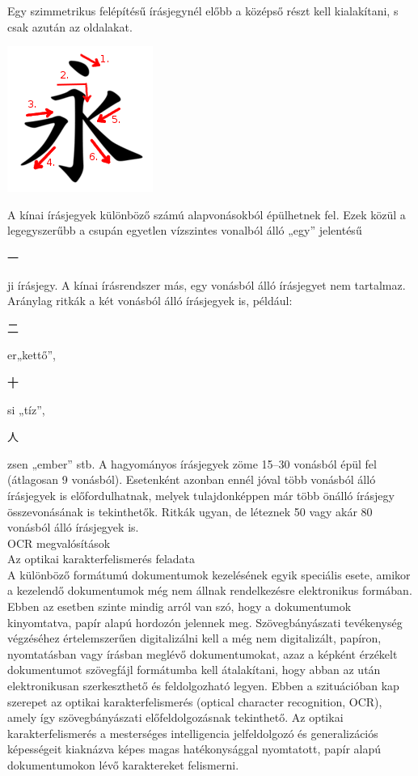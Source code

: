 Egy szimmetrikus felépítésű írásjegynél előbb a középső részt kell kialakítani, s csak azután az oldalakat.

\begin{center}
	\includegraphics[scale=1.0]{images/vonasrend_ordered.png}
\end{center}

A kínai írásjegyek különböző számú alapvonásokból épülhetnek fel. Ezek közül a legegyszerűbb a csupán egyetlen vízszintes vonalból álló „egy” jelentésű \begin{CJK*}{UTF8}{gbsn}
一
\end{CJK*} ji írásjegy. A kínai írásrendszer más, egy vonásból álló írásjegyet nem tartalmaz. Aránylag ritkák a két vonásból álló írásjegyek is, például: \begin{CJK*}{UTF8}{gbsn}
二
\end{CJK*} er„kettő”,
\begin{CJK*}{UTF8}{gbsn}
十
\end{CJK*} si „tíz”,
\begin{CJK*}{UTF8}{gbsn}
人
\end{CJK*} zsen „ember” stb. A hagyományos írásjegyek zöme 15–30 vonásból épül fel (átlagosan 9 vonásból). Esetenként azonban ennél jóval több vonásból álló írásjegyek is előfordulhatnak, melyek tulajdonképpen már több önálló írásjegy összevonásának is tekinthetők. Ritkák ugyan, de léteznek 50 vagy akár 80 vonásból álló írásjegyek is.\\

{\Large OCR megvalósítások}\\

Az optikai karakterfelismerés feladata\\

A különböző formátumú dokumentumok kezelésének egyik speciális esete, amikor a kezelendő dokumentumok még nem állnak rendelkezésre elektronikus formában. Ebben az esetben szinte mindig arról van szó, hogy a dokumentumok kinyomtatva, papír alapú hordozón jelennek meg. Szövegbányászati tevékenység végzéséhez értelemszerűen digitalizálni kell a még nem digitalizált, papíron, nyomtatásban vagy írásban meglévő dokumentumokat, azaz a képként érzékelt dokumentumot szövegfájl formátumba kell átalakítani, hogy abban az után elektronikusan szerkeszthető és feldolgozható legyen. Ebben a szituációban kap szerepet az optikai karakterfelismerés (optical character recognition, OCR), amely így szövegbányászati előfeldolgozásnak tekinthető. Az optikai karakterfelismerés a mesterséges intelligencia jelfeldolgozó és generalizációs képességeit kiaknázva képes magas hatékonysággal nyomtatott, papír alapú dokumentumokon lévő karaktereket felismerni.

